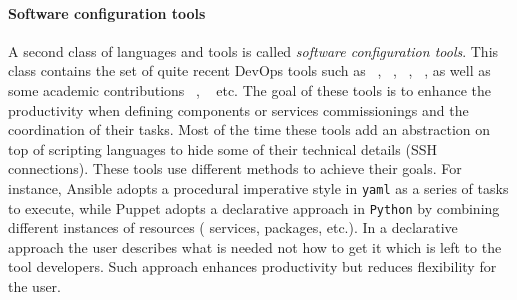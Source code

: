 \paragraph{Software configuration tools}
A second class of languages and tools is called \emph{software
  configuration tools}. This class contains the set of quite recent
DevOps tools such as \ansible~\cite{ansible:web},
\puppet~\cite{puppet:web}, \chef~\cite{chef:web},
\salt~\cite{salt:web}, as well as some academic contributions
\deployware~\cite{flissi2008ccgrid},
\aeolus~\cite{dicosmo2014ic,dicosmo:hal-01233489} etc. The goal of
these tools is to enhance the productivity when defining components or
services commissionings and the coordination of their tasks. Most of
the time these tools add an abstraction on top of scripting languages
to hide some of their technical details (\eg SSH connections). These
tools use different methods to achieve their goals. For instance,
Ansible adopts a procedural imperative style in \texttt{yaml} as a
series of tasks to execute, while Puppet adopts a declarative approach
in \texttt{Python} by combining different instances of resources (\ie
services, packages, etc.). In a declarative approach the user describes
what is needed not how to get it which is left to the tool
developers. Such approach enhances productivity but reduces
flexibility for the user.


